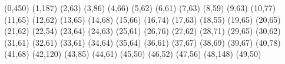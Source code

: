 (0,450)
(1,187)
(2,63)
(3,86)
(4,66)
(5,62)
(6,61)
(7,63)
(8,59)
(9,63)
(10,77)
(11,65)
(12,62)
(13,65)
(14,68)
(15,66)
(16,74)
(17,63)
(18,55)
(19,65)
(20,65)
(21,62)
(22,54)
(23,64)
(24,63)
(25,61)
(26,76)
(27,62)
(28,71)
(29,65)
(30,62)
(31,61)
(32,61)
(33,61)
(34,64)
(35,64)
(36,61)
(37,67)
(38,69)
(39,67)
(40,78)
(41,68)
(42,120)
(43,85)
(44,61)
(45,50)
(46,52)
(47,56)
(48,148)
(49,50)
